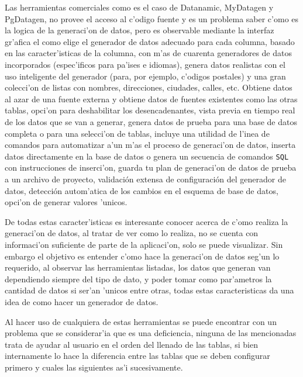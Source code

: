 Las herramientas comerciales como es el caso de Datanamic, MyDatagen y PgDatagen, no provee el acceso al c'odigo fuente y es un problema saber c'omo es la logica de la generaci'on de datos, pero es observable mediante la interfaz gr'afica el como elige el generador de datos adecuado para cada columna, basado en las caracter'isticas de la columna, con m'as de cuarenta generadores de datos incorporados (espec'ificos para pa'ises e idiomas), genera datos realistas con el uso inteligente del generador (para, por ejemplo, c'odigos postales) y una gran colecci'on de listas con nombres, direcciones, ciudades, calles, etc. Obtiene datos al azar de una fuente externa y obtiene datos de fuentes existentes como las otras tablas, opci'on para deshabilitar los desencadenantes, vista previa en tiempo real de los datos que se van a generar, genera datos de prueba para una base de datos completa o para una selecci'on de tablas, incluye una utilidad de l'inea de comandos para automatizar a'un m'as el proceso de generaci'on de datos, inserta datos directamente en la base de datos o genera un secuencia de comandos \texttt{SQL} con instrucciones de inserci'on, guarda tu plan de generaci'on de datos de prueba a un archivo de proyecto, validaci\'on extensa de configuraci\'on del generador de datos, detecci\'on autom'atica de los cambios en el esquema de base de datos, opci'on de generar valores 'unicos.

De todas estas caracter'isticas es interesante conocer acerca de c'omo realiza la generaci'on de datos, al tratar de ver como lo realiza, no se cuenta con informaci'on suficiente de parte de la aplicaci'on, solo se puede visualizar. Sin embargo el objetivo es entender c'omo hace la generaci'on de datos seg'un lo requerido, al observar las herramientas listadas, los datos que generan van dependiendo siempre del tipo de dato, y poder tomar como par'ametros la cantidad de datos si ser'an 'unicos entre otras, todas estas caracteristicas da una idea de como hacer un generador de datos.

Al hacer uso de cualquiera de estas herramientas se puede encontrar con un problema que se considerar'ia que es una deficiencia, ninguna de las mencionadas trata de ayudar al usuario en el orden del llenado de las tablas, si bien internamente lo hace la diferencia entre las tablas  que se deben configurar primero y cuales las siguientes as'i sucesivamente.